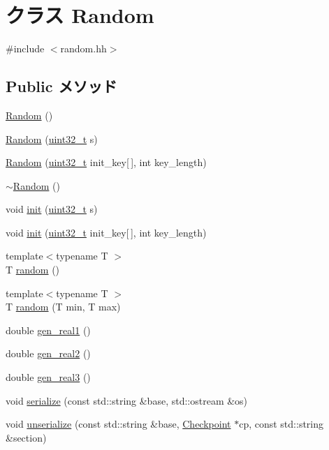 \hypertarget{classRandom}{
\section{クラス Random}
\label{classRandom}
}


{\ttfamily \#include $<$random.hh$>$}\subsection*{Public メソッド}
\begin{DoxyCompactItemize}
\item 
\hyperlink{classRandom_aa0cd23a16025cfeef7b8810eeb2a5d36}{Random} ()
\item 
\hyperlink{classRandom_ad75ec3e16831c6c1170ac666c5ee1cb3}{Random} (\hyperlink{Type_8hh_a435d1572bf3f880d55459d9805097f62}{uint32\_\-t} s)
\item 
\hyperlink{classRandom_ae435e1c7490c18469912b75b02913d74}{Random} (\hyperlink{Type_8hh_a435d1572bf3f880d55459d9805097f62}{uint32\_\-t} init\_\-key\mbox{[}$\,$\mbox{]}, int key\_\-length)
\item 
\hyperlink{classRandom_a70c16ca0bcf0c1d2b4fdbc8b0948af9b}{$\sim$Random} ()
\item 
void \hyperlink{classRandom_a6ca2c6a95080f7fb866914d4bf303e9f}{init} (\hyperlink{Type_8hh_a435d1572bf3f880d55459d9805097f62}{uint32\_\-t} s)
\item 
void \hyperlink{classRandom_ac0f9504f9735c6930e6e229d0c1cb68d}{init} (\hyperlink{Type_8hh_a435d1572bf3f880d55459d9805097f62}{uint32\_\-t} init\_\-key\mbox{[}$\,$\mbox{]}, int key\_\-length)
\item 
{\footnotesize template$<$typename T $>$ }\\T \hyperlink{classRandom_a0fd6fb9d84d010276df0648c266e563f}{random} ()
\item 
{\footnotesize template$<$typename T $>$ }\\T \hyperlink{classRandom_a285d9a49e39bd2750a46101f3fdcc1e9}{random} (T min, T max)
\item 
double \hyperlink{classRandom_a495fb8d7ce08a0109503ad1d078c6a05}{gen\_\-real1} ()
\item 
double \hyperlink{classRandom_a3f719fa0f7eb19ec2ec2322d85622aaa}{gen\_\-real2} ()
\item 
double \hyperlink{classRandom_aa84077a23487af5be5e8c5d46b6d08b9}{gen\_\-real3} ()
\item 
void \hyperlink{classRandom_ab4138b21b48e3371a8e20df72b675a88}{serialize} (const std::string \&base, std::ostream \&os)
\item 
void \hyperlink{classRandom_a147c320e3d6506edf5587a40cd8e430d}{unserialize} (const std::string \&base, \hyperlink{classCheckpoint}{Checkpoint} $\ast$cp, const std::string \&section)
\end{DoxyCompactItemize}
